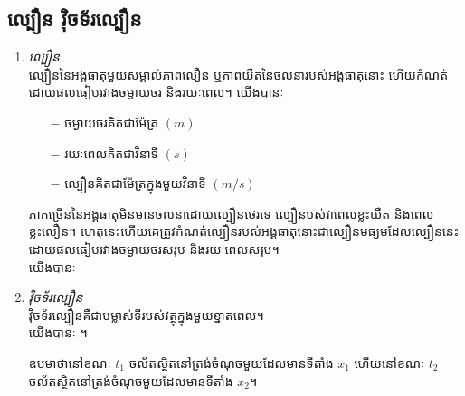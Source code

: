 \subsection{ល្បឿន វុិចទ័រល្បឿន}
\begin{enumerate}[m]
	\item \emph{\kml ល្បឿន}\\
	ល្បឿននៃអង្គធាតុមួយសម្គាល់ភាពលឿន ឬភាពយឺតនៃចលនារបស់អង្គធាតុនោះ ហើយកំណត់ដោយផលធៀបរវាងចម្ងាយចរ និងរយៈពេល។ យើងបានៈ \\
	\begin{multicols}{2}
		\begin{itemize}
			\item [$-$] ចម្ងាយចរគិតជាម៉ែត្រ $\left(m\right)$
			\item [$-$] រយៈពេលគិតជាវិនាទី $\left(s\right)$
			\item [$-$] ល្បឿនគិតជាម៉ែត្រក្នុងមួយវិនាទី $\left(m/s\right)$
		\end{itemize}
	\end{multicols}
	ភាកច្រើននៃអង្គធាតុមិនមានចលនាដោយល្បឿនថេរទេ ល្បឿនបស់វាពេលខ្លះយឺត និងពេលខ្លះលឿន។ ហេតុនេះហើយគេត្រូវកំណត់ល្បឿនរបស់អង្គធាតុនោះជាល្បឿនមធ្យមដែលល្បឿននេះដោយផលធៀបរវាងចម្ងាយចរសរុប និងរយៈពេលសរុប។\\
	យើងបានៈ 
	\item \emph{\kml វុិចទ័រល្បឿន}\\
	វុិចទ័រល្បឿនគឺជាបម្លាស់ទីរបស់វត្ថុក្នុងមួយខ្នាតពេល។\\
	យើងបានៈ ។
	\begin{multicols}{2}
		ឧបមាថានៅខណៈ $t_{1}$ ចល័តស្ថិតនៅត្រង់ចំណុចមួយដែលមានទីតាំង $x_{1}$ ហើយនៅខណៈ $t_{2}$ ចល័តស្ថិតនៅត្រង់ចំណុចមួយដែលមានទីតាំង $x_{2}$។
		\begin{figure}[H]
			\centering
\end{figure}
\end{multicols}
\end{enumerate}
